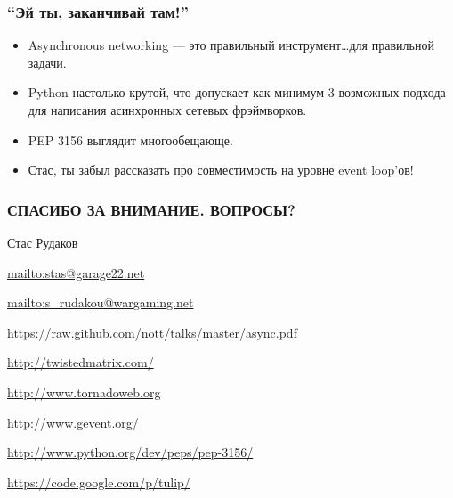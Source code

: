 \documentclass[aspectratio=169]{beamer}
\begin{document}
\begin{frame}
  \frametitle{``Эй ты, заканчивай там!''}
  \begin{itemize}
    \item Asynchronous networking --- это правильный инструмент\ldots для правильной задачи.
    \item Python настолько крутой, что допускает как минимум 3 возможных подхода для написания асинхронных сетевых фрэймворков.
    \item PEP 3156 выглядит многообещающе.
      \pause
    \item Стас, ты забыл рассказать про совместимость на уровне event loop'ов!
  \end{itemize}
\end{frame}


\begin{finalframe}
  \frametitle{СПАСИБО ЗА ВНИМАНИЕ. ВОПРОСЫ?}
    \begin{block}{Стас Рудаков}
    \par \url{mailto:stas@garage22.net}
    \par \url{mailto:s_rudakou@wargaming.net}
    \par \url{https://raw.github.com/nott/talks/master/async.pdf}
    \end{block}

    \begin{block}
    \par \url{http://twistedmatrix.com/}
    \par \url{http://www.tornadoweb.org}
    \par \url{http://www.gevent.org/}
    \par \url{http://www.python.org/dev/peps/pep-3156/}
    \par \url{https://code.google.com/p/tulip/}
    \end{block}

\end{finalframe}
\end{document}
